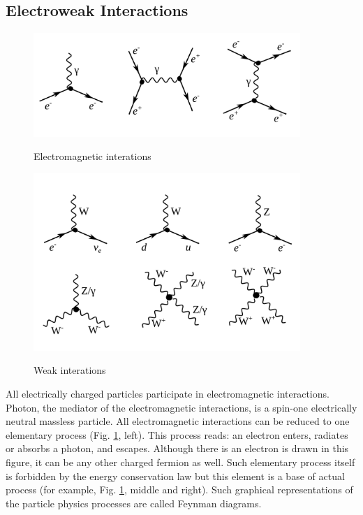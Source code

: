 \subsection{Electroweak Interactions}
\label{sec:Intro_Electroweak}

\begin{figure}[htb]
  \begin{center}
    {\includegraphics[width=0.90\textwidth]{../figs/Intro/feynmEM.png}}
    \caption{Electromagnetic interations}
    \label{fig:feynmEM}
  \end{center}
\end{figure}

\begin{figure}[htb]
  \begin{center}
    {\includegraphics[width=0.90\textwidth]{../figs/Intro/feynmW.png}}
    \caption{Weak interations}
    \label{fig:feynmW}
  \end{center}
\end{figure}

All electrically charged particles participate in electromagnetic interactions. Photon, the mediator of the electromagnetic interactions, is a spin-one electrically neutral massless particle. All electromagnetic interactions can be reduced to one elementary process (Fig. \ref{fig:feynmEM}, left). This process reads: an electron enters, radiates or absorbs a photon, and escapes. Although there is an electron is drawn in this figure, it can be any other charged fermion as well. Such elementary process itself is forbidden by the energy conservation law but this element is a base of actual process (for example, Fig. \ref{fig:feynmEM}, middle and right). Such graphical representations of the particle physics processes are called Feynman diagrams. 

